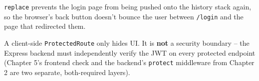 \begin{notebox}[NOTE]
\texttt{replace} prevents the login page from being pushed onto the history
stack again, so the browser's back button doesn't bounce the user between
\texttt{/login} and the page that redirected them.
\end{notebox}

\begin{warnbox}[WARNING]
A client-side \texttt{ProtectedRoute} only hides UI. It is \textbf{not} a security
boundary -- the Express backend must independently verify the JWT on every
protected endpoint (Chapter 5's frontend check and the backend's \texttt{protect}
middleware from Chapter 2 are two separate, both-required layers).
\end{warnbox}
